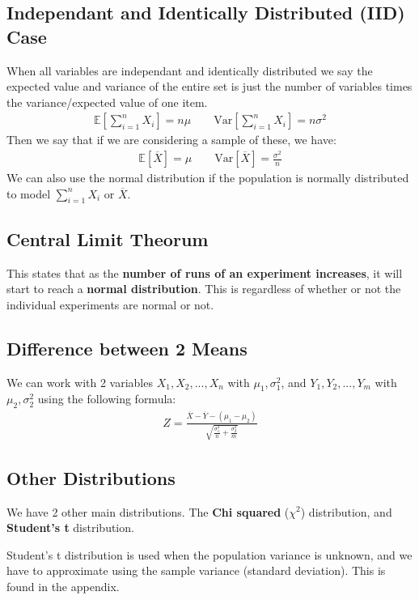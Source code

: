 \documentclass[12pt,letterpaper]{article} \usepackage{amsmath} \usepackage{graphicx} \usepackage[margin=1in]{geometry} \usepackage{longtable}  \usepackage{amssymb}
\begin{document}
	\subsection{Independant and Identically Distributed (IID) Case}
	When all variables are independant and identically distributed we say the expected value and variance of the entire set is just the number of variables times the variance/expected value of one item.
	\begin{align*}
		\mathbb E\left[\sum_{i=1}^{n}X_i\right]=n\mu \qquad \text{Var}\left[\sum_{i=1}^{n}X_i\right]=n\sigma^2
	\end{align*}
	Then we say that if we are considering a sample of these, we have:
	\begin{align*}
		\mathbb E [\overline X] = \mu \qquad \text{Var} [\overline X] = \frac{\sigma^2}{n}
	\end{align*}
	We can also use the normal distribution if the population is normally distributed to model $\sum_{i=1}^n X_i$ or $\overline X$.
	
	\subsection{Central Limit Theorum}
	This states that as the \textbf{number of runs of an experiment increases}, it will start to reach a \textbf{normal distribution}. This is regardless of whether or not the individual experiments are normal or not. 
	
	\subsection{Difference between 2 Means}
	We can work with 2 variables $X_1, X_2, ..., X_n$ with $\mu_1, \sigma^2_1$, and $Y_1, Y_2, ..., Y_m$ with $\mu_2, \sigma_2^2$ using the following formula:
	\begin{align*}
		Z = \frac{\overline X - \overline Y - (\mu_1 - \mu_2)}{\sqrt{\frac{\sigma_1^2}{n}+\frac{\sigma^2_2}{m}}}
	\end{align*}

	\subsection{Other Distributions}
	We have 2 other main distributions. The \textbf{Chi squared} ($\chi^2$) distribution, and \textbf{Student's t} distribution. 
	
	Student's t distribution is used when the population variance is unknown, and we have to approximate using the sample variance (standard deviation). This is found in the appendix.
	
\end{document}
